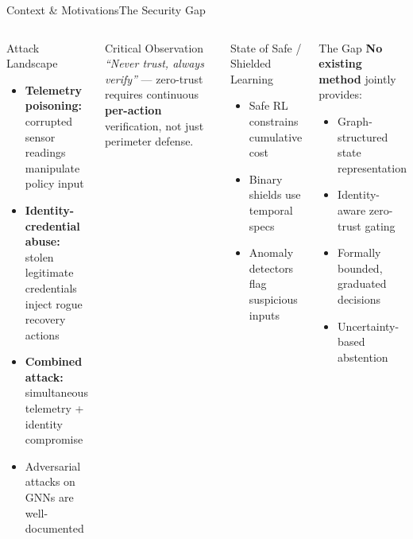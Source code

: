 \documentclass[aspectratio=169,10pt]{beamer}
\newcommand{\tightlist}{\setlength{\itemsep}{2pt}\setlength{\parskip}{0pt}\setlength{\topsep}{0pt}}
\begin{document}
\begin{frame}[t,shrink=15]{Context \& Motivations}{The Security Gap}
  \begin{columns}[t]
    \begin{block}{Attack Landscape}
      \begin{itemize}\tightlist
        \item \textbf{Telemetry poisoning:} corrupted sensor readings manipulate policy input
        \item \textbf{Identity-credential abuse:} stolen legitimate credentials inject rogue recovery actions
        \item \textbf{Combined attack:} simultaneous telemetry + identity compromise
        \item Adversarial attacks on GNNs are well-documented \cite{zugner2018adversarial,dai2018adversarial}
      \end{itemize}
    \end{block}
    \vspace{0.2cm}
    \begin{alertblock}{Critical Observation \cite{rose2020nist}}
      \emph{``Never trust, always verify''} — zero-trust requires continuous \textbf{per-action} verification, not just perimeter defense.
    \end{alertblock}
    \begin{block}{State of Safe / Shielded Learning}
      \begin{itemize}\tightlist
        \item Safe RL constrains cumulative cost \cite{achiam2017cpo,garcia2015saferl}
        \item Binary shields use temporal specs \cite{alshiekh2018shielding}
        \item Anomaly detectors flag suspicious inputs \cite{zahoor2025ifocsvm}
      \end{itemize}
    \end{block}
    \vspace{0.2cm}
    \begin{alertblock}{The Gap}
      \textbf{No existing method} jointly provides:
      \begin{itemize}\tightlist
        \item Graph-structured state representation
        \item Identity-aware zero-trust gating
        \item Formally bounded, graduated decisions
        \item Uncertainty-based abstention
      \end{itemize}
    \end{alertblock}
  \end{columns}
\end{frame}
\end{document}
